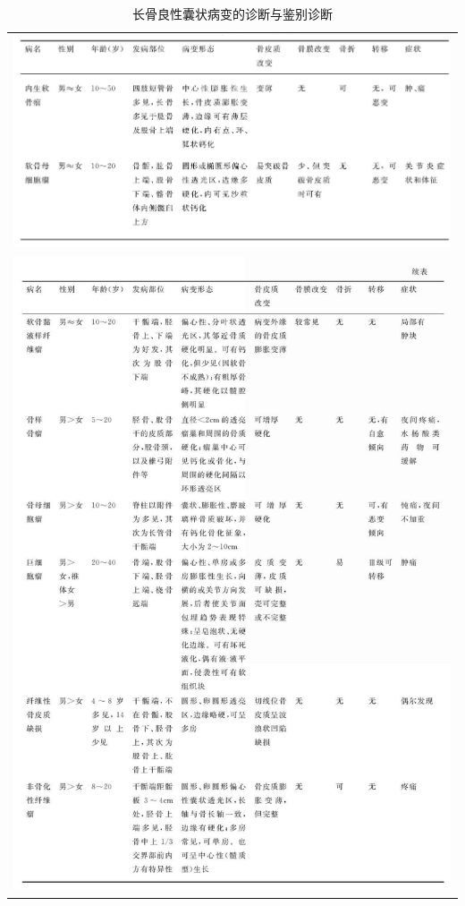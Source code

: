 \begin{longtable}{c}
  \caption{长骨良性囊状病变的诊断与鉴别诊断}
  \label{tab22-3}\\
  \endfirsthead
  \caption[]{长骨良性囊状病变的诊断与鉴别诊断}
  \endhead
\includegraphics[width=\textwidth,height=\textheight,keepaspectratio]{./images/Image00441.jpg}\\
\includegraphics[width=\textwidth,height=\textheight,keepaspectratio]{./images/Image00442.jpg}\\

\end{longtable}
